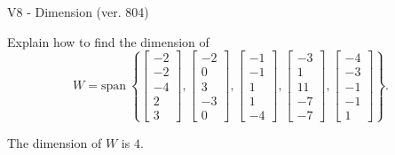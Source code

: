 \begin{exercise}
  \begin{exerciseTitle}V8 - Dimension (ver. 804)\end{exerciseTitle}
  \begin{exerciseStatement}
    Explain how to find the dimension of 
\[W=\mathrm{span}\ \left\{\left[\begin{array}{r}
-2 \\
-2 \\
-4 \\
2 \\
3
\end{array}\right] , \left[\begin{array}{r}
-2 \\
0 \\
3 \\
-3 \\
0
\end{array}\right] , \left[\begin{array}{r}
-1 \\
-1 \\
1 \\
1 \\
-4
\end{array}\right] , \left[\begin{array}{r}
-3 \\
1 \\
11 \\
-7 \\
-7
\end{array}\right] , \left[\begin{array}{r}
-4 \\
-3 \\
-1 \\
-1 \\
1
\end{array}\right]\right\}.\]



  \end{exerciseStatement}
  \begin{exerciseAnswer}
   The dimension of \(W\) is  \(4\).
  


  \end{exerciseAnswer}
\end{exercise}